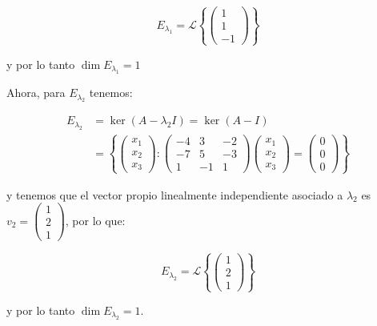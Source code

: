 \begin{ejemplo}
			\begin{equation*}
				E_{\lambda_1} = \mathcal{L} \left\{ \begin{pmatrix} 1 \\ 1 \\ -1 \end{pmatrix} \right\}
			\end{equation*}

			y por lo tanto $\dim{E_{\lambda_1}} = 1$

			Ahora, para $E_{\lambda_2}$ tenemos:

			\begin{align*}
				E_{\lambda_2} &= \ker{(A - \lambda_2 I)} = \ker{(A - I)} \\
				&= \left\{ \begin{pmatrix} x_1 \\ x_2 \\ x_3 \end{pmatrix} \colon \begin{pmatrix} -4 & 3 & -2 \\ -7 & 5 & -3 \\ 1 & -1 & 1 \end{pmatrix} \begin{pmatrix} x_1 \\ x_2 \\ x_3 \end{pmatrix} = \begin{pmatrix} 0 \\ 0 \\ 0 \end{pmatrix} \right\}
			\end{align*}

			y tenemos que el vector propio linealmente independiente asociado a $\lambda_2$ es $v_2 = \begin{pmatrix} 1 \\ 2 \\ 1 \end{pmatrix}$, por lo que:

			\begin{equation*}
				E_{\lambda_2} = \mathcal{L} \left\{ \begin{pmatrix} 1 \\ 2 \\ 1 \end{pmatrix} \right\}
			\end{equation*}

			y por lo tanto $\dim{E_{\lambda_2}} = 1$.
		\end{ejemplo}

